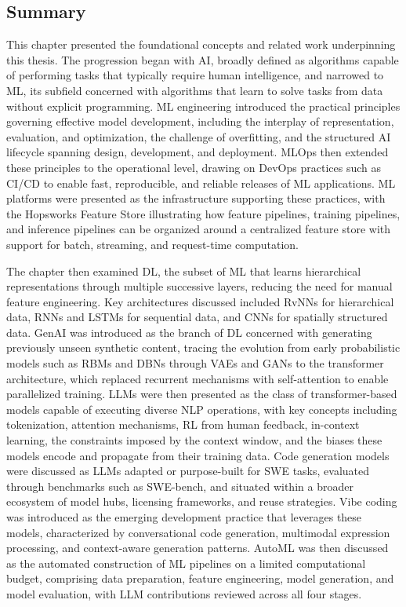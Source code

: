 \documentclass[
english,                 %
bibtex,                  %
includeExtraAbstracts, %
]{kththesis}
\numberwithin{listing}{chapter}
\begin{document}
\subsection{Summary}
\glsresetall

This chapter presented the foundational concepts and related work underpinning this thesis. The progression began with \gls{AI}, broadly defined as algorithms capable of performing tasks that typically require human intelligence, and narrowed to \gls{ML}, its subfield concerned with algorithms that learn to solve tasks from data without explicit programming. \Gls{ML} engineering introduced the practical principles governing effective model development, including the interplay of representation, evaluation, and optimization, the challenge of overfitting, and the structured \gls{AI} lifecycle spanning design, development, and deployment. \Gls{MLOps} then extended these principles to the operational level, drawing on \gls{DevOps} practices such as \gls{CI/CD} to enable fast, reproducible, and reliable releases of \gls{ML} applications. \Gls{ML} platforms were presented as the infrastructure supporting these practices, with the Hopsworks Feature Store illustrating how feature pipelines, training pipelines, and inference pipelines can be organized around a centralized feature store with support for batch, streaming, and request-time computation.

The chapter then examined \gls{DL}, the subset of \gls{ML} that learns hierarchical representations through multiple successive layers, reducing the need for manual feature engineering. Key architectures discussed included \glspl{RvNN} for hierarchical data, \glspl{RNN} and \glspl{LSTM} for sequential data, and \glspl{CNN} for spatially structured data. \Gls{GenAI} was introduced as the branch of \gls{DL} concerned with generating previously unseen synthetic content, tracing the evolution from early probabilistic models such as \glspl{RBM} and \glspl{DBN} through \glspl{VAE} and \glspl{GAN} to the transformer architecture, which replaced recurrent mechanisms with self-attention to enable parallelized training. \Glspl{LLM} were then presented as the class of transformer-based models capable of executing diverse \gls{NLP} operations, with key concepts including tokenization, attention mechanisms, \gls{RL} from human feedback, in-context learning, the constraints imposed by the context window, and the biases these models encode and propagate from their training data. Code generation models were discussed as \glspl{LLM} adapted or purpose-built for \gls{SWE} tasks, evaluated through benchmarks such as \gls{SWE}-bench, and situated within a broader ecosystem of model hubs, licensing frameworks, and reuse strategies. Vibe coding was introduced as the emerging development practice that leverages these models, characterized by conversational code generation, multimodal expression processing, and context-aware generation patterns. \Gls{AutoML} was then discussed as the automated construction of \gls{ML} pipelines on a limited computational budget, comprising data preparation, feature engineering, model generation, and model evaluation, with \gls{LLM} contributions reviewed across all four stages.
\end{document}
